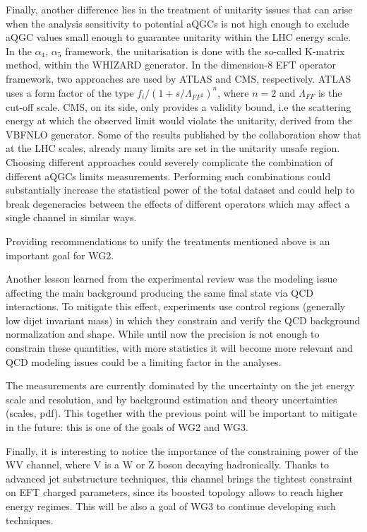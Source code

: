 Finally, another difference lies in the treatment of unitarity issues that can arise when the analysis sensitivity to potential aQGCs is not high enough to exclude aQGC values small enough to guarantee unitarity within the LHC energy scale. In the $\alpha_4$, $\alpha_5$ framework, the unitarisation is done with the so-called K-matrix method, within the WHIZARD generator. In the dimension-8 EFT operator framework, two approaches are used by ATLAS and CMS, respectively. ATLAS uses a form factor of the type $f_i/(1+s/\Lambda_{FF^2})^n$, where $n=2$ and $\Lambda_{FF}$ is the cut-off scale. CMS, on its side, only provides a validity bound, i.e the scattering energy at which the observed limit would violate the unitarity, derived from the VBFNLO generator. Some of the results published by the collaboration show that at the LHC scales, already many limits are set in the unitarity unsafe region. 
Choosing different approaches could severely complicate the combination of different aQGCs limits measurements. Performing such combinations could substantially increase the statistical power of the total dataset and could help to break degeneracies between the effects of different operators which may affect a single channel in similar ways.

Providing recommendations to unify the treatments mentioned above is an important goal for WG2. 

Another lesson learned from the experimental review was the modeling issue affecting the main background producing the same final state via QCD interactions. To mitigate this effect, experiments use control regions (generally low dijet invariant mass) in which they constrain and verify the QCD background normalization and shape. While until now the precision is not enough to constrain these quantities, with more statistics it will become more relevant and QCD modeling issues could be a limiting factor in the analyses.

The measurements are currently dominated by the uncertainty on the jet energy scale and resolution, and by background estimation and theory uncertainties (scales, pdf). This together with the previous point will be important to mitigate in the future: this is one of the goals of WG2 and WG3.
 
Finally, it is interesting to notice the importance of the constraining power of the WV channel, where V is a W or Z boson decaying hadronically. Thanks to advanced jet substructure techniques, this channel brings the tightest constraint on EFT charged parameters, since its boosted topology allows to reach higher energy regimes. This will be also a goal of WG3 to continue developing such techniques. 
